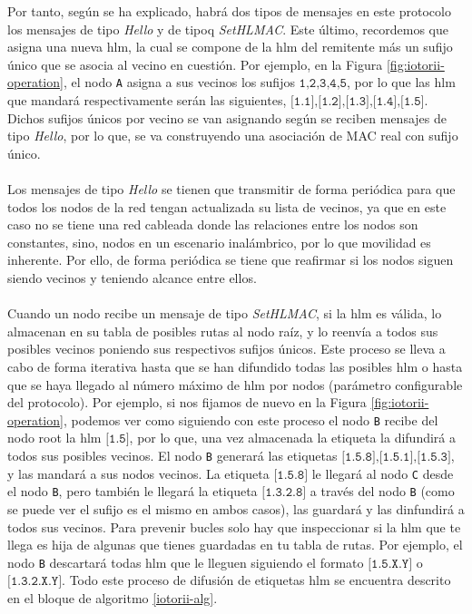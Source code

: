Por tanto, según se ha explicado, habrá dos tipos de mensajes en este protocolo los mensajes de tipo \textit{Hello} y de tipoq \textit{SetHLMAC}. Este último, recordemos que asigna una nueva \gls{hlm}, la cual se compone de la \gls{hlm} del remitente más un sufijo único que se asocia al vecino en cuestión. Por ejemplo, en la Figura \ref{fig:iotorii-operation}, el nodo \texttt{A} asigna a sus vecinos los sufijos $\texttt{1,2,3,4,5}$, por lo que las  \gls{hlm} que mandará respectivamente serán las siguientes, $\texttt{[1.1],[1.2],[1.3],[1.4],[1.5]}$. Dichos sufijos únicos por vecino se van asignando según se reciben mensajes de tipo \textit{Hello}, por lo que, se va construyendo una asociación de MAC real con sufijo único.\\
\\
Los mensajes de tipo \textit{Hello} se tienen que transmitir de forma periódica para que todos los nodos de la red tengan actualizada su lista de vecinos, ya que en este caso no se tiene una red cableada donde las relaciones entre los nodos son constantes, sino, nodos en un escenario inalámbrico, por lo que movilidad es inherente. Por ello, de forma periódica se tiene que reafirmar si los nodos siguen siendo vecinos y teniendo alcance entre ellos.\\
\\
Cuando un nodo recibe un mensaje de tipo \textit{SetHLMAC}, si la \gls{hlm} es válida, lo almacenan en su tabla de posibles rutas al nodo raíz, y lo reenvía a todos sus posibles vecinos poniendo sus respectivos sufijos únicos. Este proceso se lleva a cabo de forma iterativa hasta que se han difundido todas las posibles \gls{hlm} o hasta que se haya llegado al número máximo de \gls{hlm} por nodos (parámetro configurable del protocolo). Por ejemplo, si nos fijamos de nuevo en la Figura \ref{fig:iotorii-operation}, podemos ver como siguiendo con este proceso el nodo \texttt{B} recibe del nodo root la \gls{hlm} $\texttt{[1.5]}$, por lo que, una vez almacenada la etiqueta la difundirá a todos sus posibles vecinos. El nodo \texttt{B} generará las etiquetas $\texttt{[1.5.8],[1.5.1],[1.5.3]}$, y las mandará a sus nodos vecinos. La etiqueta $\texttt{[1.5.8]}$ le llegará al nodo \texttt{C} desde el nodo \texttt{B}, pero también le llegará la etiqueta $\texttt{[1.3.2.8]}$ a través del nodo \texttt{B} (como se puede ver el sufijo es el mismo en ambos casos), las guardará y las dinfundirá a todos sus vecinos. Para prevenir bucles solo hay que inspeccionar si la \gls{hlm} que te llega es hija de algunas que tienes guardadas en tu tabla de rutas. Por ejemplo, el nodo \texttt{B} descartará todas \gls{hlm} que le lleguen siguiendo el formato $\texttt{[1.5.X.Y]}$ o $\texttt{[1.3.2.X.Y]}$. Todo este proceso de difusión de etiquetas \gls{hlm} se encuentra descrito en el bloque de algoritmo \ref{iotorii-alg}.\\
